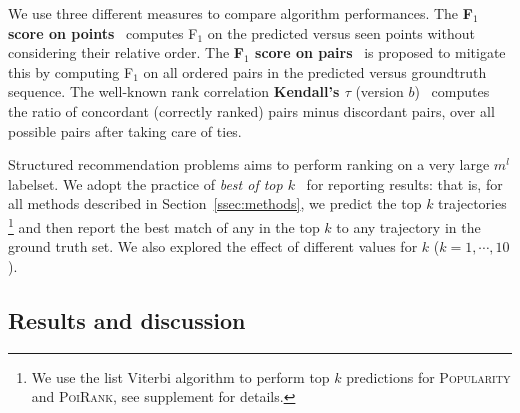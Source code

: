 We use three different measures to compare algorithm performances.
The {\bf F$_1$ score on points}~\cite{ijcai15} computes F$_1$ on the predicted versus seen points
without considering their relative order.
The {\bf F$_1$ score on pairs}~\cite{cikm16paper} is proposed to mitigate this by computing F$_1$ on all ordered pairs in the predicted versus groundtruth sequence. %
The well-known rank correlation {\bf Kendall's $\tau$} (version $b$)~\cite{agresti2010analysis} 
computes the ratio of concordant (correctly ranked) pairs minus discordant pairs, over all possible pairs after taking care of ties.

Structured recommendation problems aims to perform ranking on a very large $m^l$ labelset.
We adopt the practice of {\em best of top $k$}~\cite{russakovsky2015imagenet} for reporting results: %
that is, for all methods described in Section~\ref{ssec:methods},
we predict the top $k$ trajectories
\footnote{We use the list Viterbi algorithm to perform top $k$ predictions for \textsc{Popularity} and \textsc{PoiRank}, see supplement for details.}
and then report the best match of any in the top $k$ to any trajectory in the ground truth set.
We also explored the effect of different values for $k$ (\eg $k=1,\cdots\!,10$).



\secmoveup
\subsection{Results and discussion}
\label{sec:result}
\textmoveup

